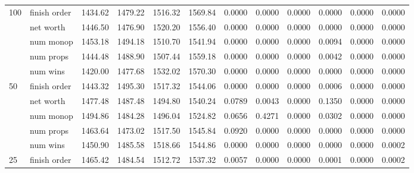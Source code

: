\begin{landscape}
\begin{table}[ht]
\begin{tabularx}{\linewidth}{|p{1in}|p{1in}|r|r|r|r|r|r|r|r|r|r|}
      \multirow{5}{*}{100} & finish order & 1434.62 & 1479.22 & \cellcolor{green!55!white}1516.32 & \cellcolor{green!55!white}1569.84 & 0.0000 & 0.0000 & 0.0000 & 0.0000 & 0.0000 & 0.0000 \\
\cline{2-12}             & net worth & 1446.50 & 1476.90 & \cellcolor{green!55!white}1520.20 & \cellcolor{green!55!white}1556.40 & 0.0000 & 0.0000 & 0.0000 & 0.0000 & 0.0000 & 0.0000 \\
\cline{2-12}             & num monop & 1453.18 & 1494.18 & \cellcolor{green!55!white}1510.70 & \cellcolor{green!55!white}1541.94 & 0.0000 & 0.0000 & 0.0000 & 0.0094 & 0.0000 & 0.0000 \\
\cline{2-12}             & num props & 1444.48 & 1488.90 & \cellcolor{green!55!white}1507.44 & \cellcolor{green!55!white}1559.18 & 0.0000 & 0.0000 & 0.0000 & 0.0042 & 0.0000 & 0.0000 \\
\cline{2-12}             & num wins & 1420.00 & 1477.68 & \cellcolor{green!55!white}1532.02 & \cellcolor{green!55!white}1570.30 & 0.0000 & 0.0000 & 0.0000 & 0.0000 & 0.0000 & 0.0000 \\
      \cline{1-12}
      \multirow{5}{*}{50} & finish order & 1443.32 & 1495.30 & \cellcolor{green!55!white}1517.32 & \cellcolor{green!55!white}1544.06 & 0.0000 & 0.0000 & 0.0000 & 0.0006 & 0.0000 & 0.0000 \\
\cline{2-12}             & net worth & 1477.48 & 1487.48 & 1494.80 & \cellcolor{green!55!white}1540.24 & \cellcolor{red!55!white}0.0789 & 0.0043 & 0.0000 & \cellcolor{red!55!white}0.1350 & 0.0000 & 0.0000 \\
\cline{2-12}             & num monop & 1494.86 & 1484.28 & 1496.04 & \cellcolor{green!55!white}1524.82 & \cellcolor{red!55!white}0.0656 & \cellcolor{red!55!white}0.4271 & 0.0000 & \cellcolor{red!55!white}0.0302 & 0.0000 & 0.0000 \\
\cline{2-12}             & num props & 1463.64 & 1473.02 & \cellcolor{green!55!white}1517.50 & \cellcolor{green!55!white}1545.84 & \cellcolor{red!55!white}0.0920 & 0.0000 & 0.0000 & 0.0000 & 0.0000 & 0.0000 \\
\cline{2-12}             & num wins & 1450.90 & 1485.58 & \cellcolor{green!55!white}1518.66 & \cellcolor{green!55!white}1544.86 & 0.0000 & 0.0000 & 0.0000 & 0.0000 & 0.0000 & 0.0002 \\
      \cline{1-12}
      \multirow{5}{*}{25} & finish order & 1465.42 & 1484.54 & \cellcolor{green!55!white}1512.72 & \cellcolor{green!55!white}1537.32 & 0.0057 & 0.0000 & 0.0000 & 0.0001 & 0.0000 & 0.0002 \\

\end{tabularx}
\end{table}
\end{landscape}
